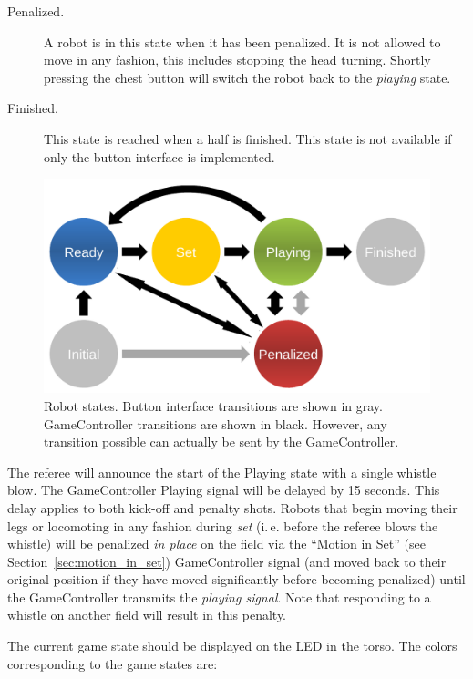 \documentclass[12pt]{article}
\newcommand{\ie}{\mbox{i.\,e.}\xspace}
\newcommand{\cf}{see\xspace}
\newcommand{\PlayingDelayTime}{15 seconds\xspace}
\begin{document}
\begin{description}
\item[Penalized.] A robot is in this state when it has been penalized. It is not allowed to move in any fashion,  this includes stopping the head turning. Shortly pressing the chest button will switch the robot back to the \emph{playing} state.

\item[Finished.] This state is reached when a half is finished. This state is not available if only the button interface is implemented.

\end{description}

\begin{figure}[t]
\centerline{\includegraphics[width=0.9\columnwidth]{figs/states.pdf}}
\caption{Robot states. Button interface transitions are shown in gray. GameController transitions are shown in black. However, any transition possible can actually be sent by the GameController.}
\label{fig:robot_states}
\end{figure}

The referee will announce the start of the Playing state with a single whistle blow.
The GameController Playing signal will be delayed by \PlayingDelayTime.
This delay applies to both kick-off and penalty shots.
Robots that begin moving their legs or locomoting in any fashion during \emph{set} (\ie before the referee blows the whistle) will be penalized \textit{in place} on the field via the ``Motion in Set'' (\cf Section~\ref{sec:motion_in_set}) GameController signal (and moved back to their original position if they have moved significantly before becoming penalized) until the GameController transmits the \emph{playing signal}.
Note that responding to a whistle on another field will result in this penalty.

The current game state should be displayed on the LED in the torso. The colors corresponding to the game states are:
\end{document}

